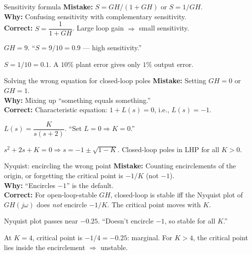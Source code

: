 \documentclass[11pt]{article}
\begin{document}
\begin{pitfallbox}{Sensitivity formula}
\textbf{Mistake:} $S = GH/(1+GH)$ or $S = 1/GH$.\\
\textbf{Why:} Confusing sensitivity with complementary sensitivity.\\
\textbf{Correct:} $S = \dfrac{1}{1 + GH}$. Large loop gain $\Rightarrow$ small sensitivity.
\begin{wrongbox}
$GH = 9$. ``$S = 9/10 = 0.9$ --- high sensitivity.''
\end{wrongbox}
\begin{rightbox}
$S = 1/10 = 0.1$. A $10\%$ plant error gives only $1\%$ output error.
\end{rightbox}
\end{pitfallbox}

\begin{pitfallbox}{Solving the wrong equation for closed-loop poles}
\textbf{Mistake:} Setting $GH = 0$ or $GH = 1$.\\
\textbf{Why:} Mixing up ``something equals something.''\\
\textbf{Correct:} Characteristic equation: $1 + L(s) = 0$, i.e., $L(s) = -1$.
\begin{wrongbox}
$L(s) = \dfrac{K}{s(s+2)}$. ``Set $L = 0 \Rightarrow K = 0$.''
\end{wrongbox}
\begin{rightbox}
$s^2 + 2s + K = 0 \Rightarrow s = -1 \pm \sqrt{1-K}$. Closed-loop poles in LHP for all $K>0$.
\end{rightbox}
\end{pitfallbox}

\begin{pitfallbox}{Nyquist: encircling the wrong point}
\textbf{Mistake:} Counting encirclements of the origin, or forgetting the critical point is $-1/K$ (not $-1$).\\
\textbf{Why:} ``Encircles $-1$'' is the default.\\
\textbf{Correct:} For open-loop-stable $GH$, closed-loop is stable iff the Nyquist plot of $GH(j\omega)$ does \emph{not} encircle $-1/K$. The critical point moves with $K$.
\begin{wrongbox}
Nyquist plot passes near $-0.25$. ``Doesn't encircle $-1$, so stable for all $K$.''
\end{wrongbox}
\begin{rightbox}
At $K = 4$, critical point is $-1/4 = -0.25$: marginal. For $K > 4$, the critical point lies inside the encirclement $\Rightarrow$ unstable.
\end{rightbox}
\end{pitfallbox}
\end{document}
